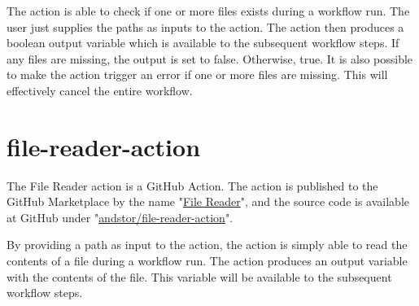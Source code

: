 The action is able to check if one or more files exists during a workflow run. The user just supplies the paths as inputs to the action. The action then produces a boolean output variable which is available to the subsequent workflow steps. If any files are missing, the output is set to false. Otherwise, true. It is also possible to make the action trigger an error if one or more files are missing. This will effectively cancel the entire workflow.

\section{file-reader-action}
The File Reader action is a GitHub Action. The action is published to the GitHub Marketplace by the name "\href{https://github.com/marketplace/actions/file-reader}{File Reader}", and the source code is available at GitHub under "\href{https://github.com/andstor/file-reader-action}{andstor/file-reader-action}".

By providing a path as input to the action, the action is simply able to read the contents of a file during a workflow run. The action produces an output variable with the contents of the file. This variable will be available to the subsequent workflow steps.

